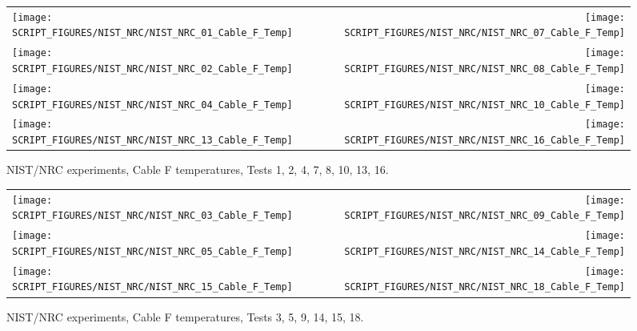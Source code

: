 \begin{figure}[p]
\begin{tabular*}{\textwidth}{l@{\extracolsep{\fill}}r}
\texttt{[image: SCRIPT\_FIGURES/NIST\_NRC/NIST\_NRC\_01\_Cable\_F\_Temp]} &
\texttt{[image: SCRIPT\_FIGURES/NIST\_NRC/NIST\_NRC\_07\_Cable\_F\_Temp]} \\
\texttt{[image: SCRIPT\_FIGURES/NIST\_NRC/NIST\_NRC\_02\_Cable\_F\_Temp]} &
\texttt{[image: SCRIPT\_FIGURES/NIST\_NRC/NIST\_NRC\_08\_Cable\_F\_Temp]} \\
\texttt{[image: SCRIPT\_FIGURES/NIST\_NRC/NIST\_NRC\_04\_Cable\_F\_Temp]} &
\texttt{[image: SCRIPT\_FIGURES/NIST\_NRC/NIST\_NRC\_10\_Cable\_F\_Temp]} \\
\texttt{[image: SCRIPT\_FIGURES/NIST\_NRC/NIST\_NRC\_13\_Cable\_F\_Temp]} &
\texttt{[image: SCRIPT\_FIGURES/NIST\_NRC/NIST\_NRC\_16\_Cable\_F\_Temp]}
\end{tabular*}
\caption[NIST/NRC experiments, Cable F temperatures, Tests 1, 2, 4, 7, 8, 10, 13, 16]{NIST/NRC experiments, Cable F temperatures, Tests 1, 2, 4, 7, 8, 10, 13, 16.}
\label{NIST_NRC_Cable_F_Closed}
\end{figure}

\begin{figure}[p]
\begin{tabular*}{\textwidth}{l@{\extracolsep{\fill}}r}
\texttt{[image: SCRIPT\_FIGURES/NIST\_NRC/NIST\_NRC\_03\_Cable\_F\_Temp]} &
\texttt{[image: SCRIPT\_FIGURES/NIST\_NRC/NIST\_NRC\_09\_Cable\_F\_Temp]} \\
\texttt{[image: SCRIPT\_FIGURES/NIST\_NRC/NIST\_NRC\_05\_Cable\_F\_Temp]} &
\texttt{[image: SCRIPT\_FIGURES/NIST\_NRC/NIST\_NRC\_14\_Cable\_F\_Temp]} \\
\texttt{[image: SCRIPT\_FIGURES/NIST\_NRC/NIST\_NRC\_15\_Cable\_F\_Temp]} &
\texttt{[image: SCRIPT\_FIGURES/NIST\_NRC/NIST\_NRC\_18\_Cable\_F\_Temp]}
\end{tabular*}
\caption[NIST/NRC experiments, Cable F temperatures, Tests 3, 5, 9, 14, 15, 18]{NIST/NRC experiments, Cable F temperatures, Tests 3, 5, 9, 14, 15, 18.}
\label{NIST_NRC_Cable_F_Open}
\end{figure}

